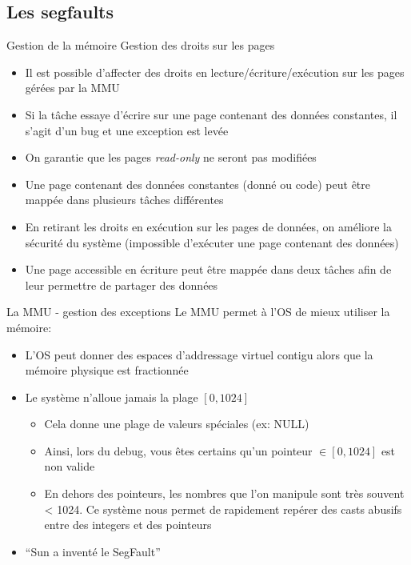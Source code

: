 \subsection{Les segfaults}

\begin{frame}{Gestion de la mémoire}
  Gestion des droits sur les pages
  \begin{itemize}
  \item    Il    est     possible    d'affecter    des    droits    en
    lecture/écriture/exécution sur les pages gérées par la MMU
  \item Si la tâche essaye d'écrire sur une page contenant des données
    constantes, il s'agit d'un bug et une exception est levée
  \item  On garantie  que  les pages  \emph{read-only}  ne seront  pas
    modifiées
  \item Une page contenant des données constantes (donné ou code) peut
    être mappée dans plusieurs tâches différentes
  \item En retirant les droits  en exécution sur les pages de données,
    on améliore la sécurité du système (impossible d'exécuter une page
    contenant des données)
  \item Une  page accessible  en écriture peut  être mappée  dans deux
    tâches afin de leur permettre de partager des données
  \end{itemize}
\end{frame}

\begin{frame}{La MMU - gestion des exceptions}
  Le MMU permet à l'OS de mieux utiliser la mémoire:
  \begin{itemize}
  \item  L'OS peut  donner  des espaces  d'addressage virtuel  contigu
    alors que la mémoire physique est fractionnée
  \item Le système n'alloue jamais la plage $[0, 1024]$
    \begin{itemize}
    \item Cela donne une plage de valeurs spéciales (ex: NULL)
    \item Ainsi, lors du debug, vous êtes certains qu'un pointeur $\in
      [0, 1024]$ est non valide
    \item En dehors des pointeurs,  les nombres que l'on manipule sont
      très  souvent <  1024.   Ce système  nous  permet de  rapidement
      repérer des casts abusifs entre des integers et des pointeurs
    \end{itemize}
  \item ``Sun a inventé le SegFault''
  \end{itemize}
\end{frame}

